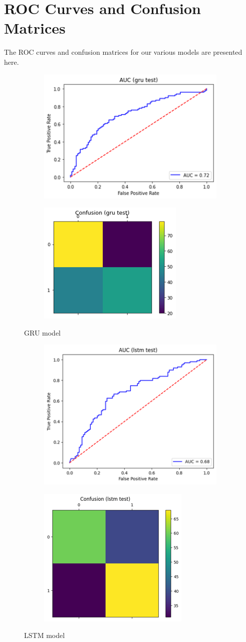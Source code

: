 \documentclass[format=sigconf, nonacm=true, review=true, screen=true]{acmart}
\begin{document}
\newpage



\newpage
\onecolumn
\appendix
\section{ROC Curves and Confusion Matrices} \label{App:ROC_Curves}
The ROC curves and confusion matrices for our various models are presented here.

\renewcommand{\thefigure}{A.\arabic{figure}}
\setcounter{figure}{0}

\begin{figure}[H]
     \centering
     \begin{subfigure}
         \centering
         \includegraphics[width=0.24\columnwidth]{figures/gru-roc.png}
     \end{subfigure}
     \begin{subfigure}
         \centering
         \includegraphics[width=0.24\columnwidth]{figures/gru-cm.png}
     \end{subfigure}
     \caption{GRU model}
     \label{fig:gru-roc-cm}
     
     \centering
     \begin{subfigure}
         \centering
         \includegraphics[width=0.24\columnwidth]{figures/lstm-roc.png}
     \end{subfigure}
     \begin{subfigure}
         \centering
         \includegraphics[width=0.24\columnwidth]{figures/lstm-cm.png}
     \end{subfigure}
     \caption{LSTM model}
     \label{fig:lstm-roc-cm}


\end{figure}
\end{document}
